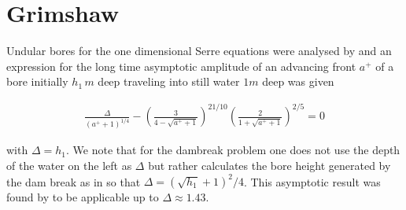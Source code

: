 \documentclass[12pt]{article}
\begin{document}
\section{Grimshaw}
Undular bores for the one dimensional Serre equations were analysed by  and an expression for the long time asymptotic amplitude of an advancing front $a^+$ of a bore initially $h_1 \,m$ deep traveling into still water $1m$ deep was given
\begin{linenomath*}
\begin{gather}
\frac{\Delta}{\left(a^+ + 1\right)^{1/4}} - \left(\frac{3}{4 - \sqrt{a^+ + 1}}\right)^{21/10}\left(\frac{2}{1 + \sqrt{a^+ + 1}}\right)^{2/5} = 0
\end{gather}
\end{linenomath*}
 with $\Delta = h_1$. We note that for the dambreak problem one does not use the depth of the water on the left as $\Delta$ but rather calculates the bore height generated by the dam break as in  so that $\Delta =  \left(\sqrt{h_1} + 1\right)^2/4$. This asymptotic result was found by  to be applicable up to $\Delta \approx 1.43$. 
\end{document}
